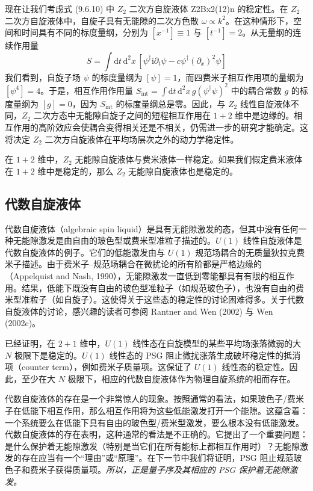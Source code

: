 现在让我们考虑式 (9.6.10) 中 $Z_2$ 二次方自旋液体 Z2Bx2(12)n 的稳定性。在 $Z_2$ 二次方自旋液体中，自旋子具有无能隙的二次方色散 $\omega\propto k^{2}$。在这种情形下，空间和时间具有不同的标度量纲，分别为 $[x^{-1}]\equiv1$ 与 $[t^{-1}]=2$。从无量纲的连续作用量
\begin{equation*}
S=\int\mathrm{d}t\,\mathrm{d}^{2}x\,\left[\psi^{\dagger}\mathrm{i}\partial_{t}\psi-c\psi^{\dagger}(\partial_{x})^{2}\psi\right]
\end{equation*}
我们看到，自旋子场 $\psi$ 的标度量纲为 $[\psi]=1$，而四费米子相互作用项的量纲为 $[\psi^{4}]=4$。于是，相互作用作用量 $S_{\mathrm{int}}=\int\mathrm{d}t\,\mathrm{d}^{2}x\,g(\psi^{\dagger}\psi)^{2}$ 中的耦合常数 $g$ 的标度量纲为 $[g]=0$，因为 $S_{\mathrm{int}}$ 的标度量纲总是零。因此，与 $Z_2$ 线性自旋液体不同，$Z_2$ 二次方态中无能隙自旋子之间的短程相互作用在 $1+2$ 维中是边缘的。相互作用的高阶效应会使耦合变得相关还是不相关，仍需进一步的研究才能确定。这将决定 $Z_2$ 二次方自旋液体在平均场层次之外的动力学稳定性。

在 $1+2$ 维中，$Z_2$ 无能隙自旋液体与费米液体一样稳定。如果我们假定费米液体在 $1+2$ 维中是稳定的，那么 $Z_2$ 无能隙自旋液体也是稳定的。

\subsection{代数自旋液体}

代数自旋液体（algebraic spin liquid）是具有无能隙激发的态，但其中没有任何一种无能隙激发是由自由的玻色型或费米型准粒子描述的。$U(1)$ 线性自旋液体是代数自旋液体的例子。它们的低能激发由与 $U(1)$ 规范场耦合的无质量狄拉克费米子描述。由于费米子--规范场耦合在微扰论的所有阶都是严格边缘的（Appelquist and Nash, 1990），无能隙激发一直低到零能都具有有限的相互作用。结果，低能下既没有自由的玻色型准粒子（如规范玻色子），也没有自由的费米型准粒子（如自旋子）。这使得关于这些态的稳定性的讨论困难得多。关于代数自旋液体的讨论，感兴趣的读者可参阅 Rantner and Wen (2002) 与 Wen (2002c)。

已经证明，在 $2+1$ 维中，$U(1)$ 线性态在自旋模型的某些平均场涨落微弱的大 $N$ 极限下是稳定的。$U(1)$ 线性态的 PSG 阻止微扰涨落生成破坏稳定性的抵消项（counter term），例如费米子质量项。这保证了 $U(1)$ 线性态的稳定性。因此，至少在大 $N$ 极限下，相应的代数自旋液体作为物理自旋系统的相而存在。

代数自旋液体的存在是一个非常惊人的现象。按照通常的看法，如果玻色子/费米子在低能下相互作用，那么相互作用将为这些低能激发打开一个能隙。这蕴含着：一个系统要么在低能下具有自由的玻色型/费米型激发，要么根本没有低能激发。代数自旋液体的存在表明，这种通常的看法是不正确的。它提出了一个重要问题：是什么保护着无能隙激发（特别是当它们在所有能标上都相互作用时）？无能隙激发的存在应当有一个“理由”或“原理”。在下一节中我们将证明，PSG 阻止规范玻色子和费米子获得质量项。\emph{所以，正是量子序及其相应的 PSG 保护着无能隙激发。}

